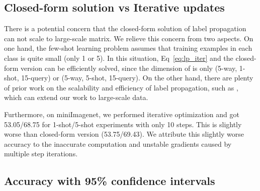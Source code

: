 \documentclass{article} \usepackage{iclr2019_conference,times}
\begin{document}
\subsection{Closed-form solution vs Iterative updates}
\label{sec:time}

There is a potential concern that the closed-form solution of label propagation can not scale to large-scale matrix. 
We relieve this concern from two aspects. On one hand, the few-shot learning problem assumes that training examples in each class is quite small (only 1 or 5). In this situation, Eq~\ref{eq:lp_iter} and the closed-form version can be efficiently solved, since the dimension of  is only  (5-way, 1-shot, 15-query) or  (5-way, 5-shot, 15-query). On the other hand, there are plenty of prior work on the scalability and efficiency of label propagation, such as \cite{scale1,scale2}, which can extend our work to large-scale data. 

Furthermore, on miniImagenet, we performed iterative optimization and got 53.05/68.75 for 1-shot/5-shot experiments with only 10 steps. This is slightly worse than closed-form version (53.75/69.43). We attribute this slightly worse accuracy to the inaccurate computation and unstable gradients caused by multiple step iterations. 






\subsection{Accuracy with 95\% confidence intervals}
\label{sec:std}
\end{document}

